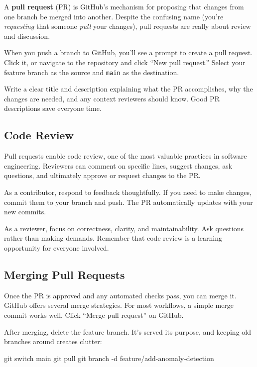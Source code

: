 \documentclass[
  letterpaper,
  DIV=11,
  numbers=noendperiod]{scrreprt}
\newenvironment{Shaded}{\begin{snugshade}}{\end{snugshade}}
\newcommand{\AttributeTok}[1]{\textcolor[rgb]{0.40,0.45,0.13}{#1}}
\newcommand{\FunctionTok}[1]{\textcolor[rgb]{0.28,0.35,0.67}{#1}}
\newcommand{\NormalTok}[1]{\textcolor[rgb]{0.00,0.23,0.31}{#1}}
\begin{document}
A \textbf{pull request} (PR) is GitHub's mechanism for proposing that
changes from one branch be merged into another. Despite the confusing
name (you're \emph{requesting} that someone \emph{pull} your changes),
pull requests are really about review and discussion.

When you push a branch to GitHub, you'll see a prompt to create a pull
request. Click it, or navigate to the repository and click ``New pull
request.'' Select your feature branch as the source and \texttt{main} as
the destination.

Write a clear title and description explaining what the PR accomplishes,
why the changes are needed, and any context reviewers should know. Good
PR descriptions save everyone time.

\subsection{Code Review}\label{code-review}

Pull requests enable code review, one of the most valuable practices in
software engineering. Reviewers can comment on specific lines, suggest
changes, ask questions, and ultimately approve or request changes to the
PR.

As a contributor, respond to feedback thoughtfully. If you need to make
changes, commit them to your branch and push. The PR automatically
updates with your new commits.

As a reviewer, focus on correctness, clarity, and maintainability. Ask
questions rather than making demands. Remember that code review is a
learning opportunity for everyone involved.

\subsection{Merging Pull Requests}\label{merging-pull-requests}

Once the PR is approved and any automated checks pass, you can merge it.
GitHub offers several merge strategies. For most workflows, a simple
merge commit works well. Click ``Merge pull request'' on GitHub.

After merging, delete the feature branch. It's served its purpose, and
keeping old branches around creates clutter:

\begin{codelisting}

\caption{\texttt{terminal}}

\begin{Shaded}
\begin{Highlighting}[]
\FunctionTok{git}\NormalTok{ switch main}
\FunctionTok{git}\NormalTok{ pull}
\FunctionTok{git}\NormalTok{ branch }\AttributeTok{{-}d}\NormalTok{ feature/add{-}anomaly{-}detection}
\end{Highlighting}
\end{Shaded}

\end{codelisting}
\end{document}
